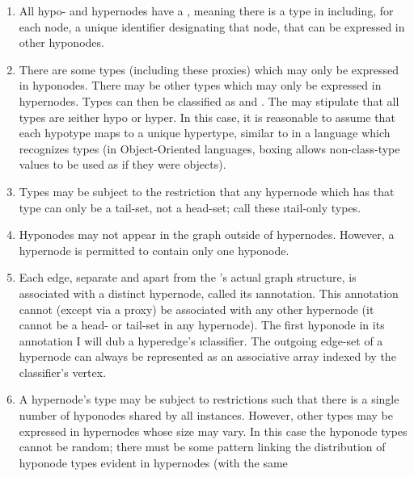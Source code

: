 {\begin{enumerate}
unwarranted to assume (without type-level semantics) that two equatable
hypernodes in different graphs are or are not inferentially equivalent.
Conversely, even if graphs are uniquely labeled \mdash{} which would
appear to enable a formal distinction between hypernodes in one
graph from those in another, \CH{}
semantics does not permit the assumption that this separation alone
justifies inferences presupposing that their hypernodes
\i{are not} inferentially equivalent.
\item{}  All hypo- and hypernodes have a , meaning there is a type in
\TyS{} including, for each node, a unique identifier designating
that node, that can be expressed in other hyponodes.
\item{}  There are some types (including these proxies) which may only be expressed
in hyponodes.  There may be other types which may only be expressed
in hypernodes.  Types can then be classified as  and .
The \TyS{} may stipulate that all types are \i{either} hypo or hyper.  In
this case, it is reasonable to assume that each hypotype maps to a unique
hypertype, similar to  in a language which recognizes 
types (in Object-Oriented languages, boxing allows non-class-type
values to be used as if they were objects).
\item{}  Types may be subject to the restriction that any hypernode which has that
type can only be a tail-set, not a head-set; call these \i{tail-only} types.
\item{}  Hyponodes may not appear in the graph outside of hypernodes.  However, a
hypernode is permitted to contain only one hyponode.
\item{}  Each edge, separate and apart from the \CH{}'s actual graph structure,
is associated with a distinct hypernode, called its \i{annotation}.  This
annotation cannot (except via a proxy) be associated with any other hypernode
(it cannot be a head- or tail-set in any hypernode).
The first hyponode in its annotation I will 
dub a hyperedge's \i{classifier}.  The outgoing edge-set of a hypernode can
always be represented as an associative array indexed by the classifier's vertex.
\item{}  A hypernode's type may be subject to restrictions such that there is a
single number of hyponodes shared by all instances.  However, other types may be
expressed in hypernodes whose size may vary.  In this case the
hyponode types cannot be random; there must be some pattern linking
the distribution of hyponode types evident in hypernodes (with the same

\end{enumerate}}
